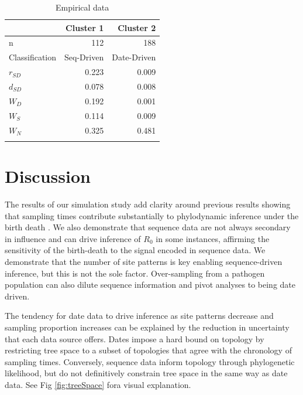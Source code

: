 \documentclass{article}
\begin{document}
\begin{table}[H]
\centering
\caption{Empirical data}
\begin{tabular}{lrr}
                    &   Cluster 1      &   Cluster 2     \\
\midrule
n                   &   112             &   188             \\
Classification      &   Seq-Driven       &   Date-Driven    \\
$r_{SD}$          &   0.223            &   0.009          \\
$d_{SD}$          &   0.078           &   0.008          \\
$W_{D}$             &   0.192            &   0.001          \\
$W_{S}$             &   0.114            &   0.009          \\
$W_{N}$             &   0.325            &   0.481          \\
\bottomrule 
\label{tab:tab2}
\end{tabular}
\end{table}
\section*{Discussion}
The results of our simulation study add clarity around previous results showing that sampling times contribute substantially to phylodynamic inference under the birth death \citep{volz_sampling_2014, Featherstone2021Infectious}. We also demonstrate that sequence data are not always secondary in influence and can drive inference of $R_{0}$ in some instances, affirming the sensitivity of the birth-death to the signal encoded in sequence data. We demonstrate that the number of site patterns is key enabling sequence-driven inference, but this is not the sole factor. Over-sampling from a pathogen population can also dilute sequence information and pivot analyses to being date driven. 

The tendency for date data to drive inference as site patterns decrease and sampling proportion increases  can be explained by the reduction in uncertainty that each data source offers. Dates impose a hard bound on topology by restricting tree space to a subset of topologies that agree with the chronology of sampling times. Conversely, sequence data inform topology through phylogenetic likelihood, but do not definitively constrain tree space in the same way as date data. See Fig \ref{fig:treeSpace} fora visual explanation.
\end{document}
